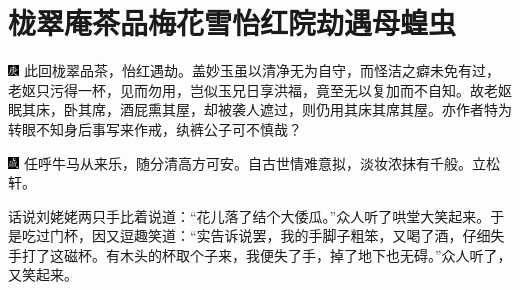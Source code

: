 

\chapter{栊翠庵茶品梅花雪\hspace{.5em}怡红院劫遇母蝗虫}

{\includegraphics[width=3mm]{../Images/00004} \kaishu 此回栊翠品茶，怡红遇劫。盖妙玉虽以清净无为自守，而怪洁之癖未免有过，老妪只污得一杯，见而勿用，岂似玉兄日享洪福，竟至无以复加而不自知。故老妪眠其床，卧其席，酒屁熏其屋，却被袭人遮过，则仍用其床其席其屋。亦作者特为转眼不知身后事写来作戒，纨裤公子可不慎哉？}

{\includegraphics[width=3mm]{../Images/00005} \kaishu 任呼牛马从来乐，随分清高方可安。自古世情难意拟，淡妆浓抹有千般。立松轩。}

话说刘姥姥两只手比着说道：“花儿落了结个大倭瓜。”众人听了哄堂大笑起来。于是吃过门杯，因又逗趣笑道：“实告诉说罢，我的手脚子粗笨，又喝了酒，仔细失手打了这磁杯。有木头的杯取个子来，我便失了手，掉了地下也无碍。”众人听了，又笑起来。


